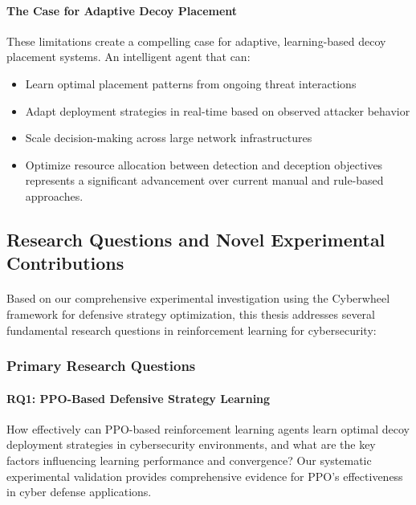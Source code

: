 \documentclass[12pt,oneside]{article}
\begin{document}
\paragraph{The Case for Adaptive Decoy Placement}

These limitations create a compelling case for adaptive, learning-based decoy placement systems. An intelligent agent that can:
\begin{itemize}
    \item Learn optimal placement patterns from ongoing threat interactions
    \item Adapt deployment strategies in real-time based on observed attacker behavior
    \item Scale decision-making across large network infrastructures
    \item Optimize resource allocation between detection and deception objectives represents a significant advancement over current manual and rule-based approaches.
\end{itemize}

\subsection{Research Questions and Novel Experimental Contributions}

\paragraph{}Based on our comprehensive experimental investigation using the Cyberwheel framework for defensive strategy optimization, this thesis addresses several fundamental research questions in reinforcement learning for cybersecurity:

\subsubsection{Primary Research Questions}

\paragraph{RQ1: PPO-Based Defensive Strategy Learning} 
How effectively can PPO-based reinforcement learning agents learn optimal decoy deployment strategies in cybersecurity environments, and what are the key factors influencing learning performance and convergence? Our systematic experimental validation provides comprehensive evidence for PPO's effectiveness in cyber defense applications.
\end{document}
